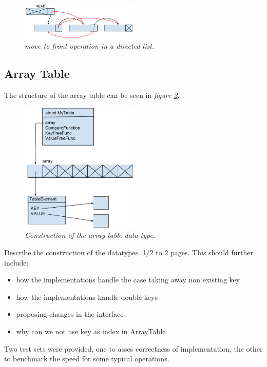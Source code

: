\documentclass[a4paper,11pt,twoside]{article}
\begin{document}
\begin{figure}[H]
\centering
\includegraphics[width=0.5\textwidth]{figures/movetofront.pdf}
\caption{\textit{move to front operation in a directed list.}}
\label{fig:movetofront}
\end{figure}



\subsection{Array Table}
The structure of the array table can be seen in \textit{figure \ref{fig:arraytable}}. 
\begin{figure}[H]
\centering
\includegraphics[width=0.5\textwidth]{figures/arraytable.pdf}
\caption{\textit{Construction of the array table data type.}}
\label{fig:arraytable}
\end{figure}

Describe the construction of the datatypes. 1/2 to 2 pages. This
should further include:

\begin{itemize}
\item how the implementations handle the case taking away non existing
  key
\item how the implementations handle double keys
\item proposing changes in the interface
\item why can we not use key as index in ArrayTable
\end{itemize}

Two test sets were provided, one to asses correctness of
implementation, the other to benchmark the speed for some typical
operations. 
\end{document}
